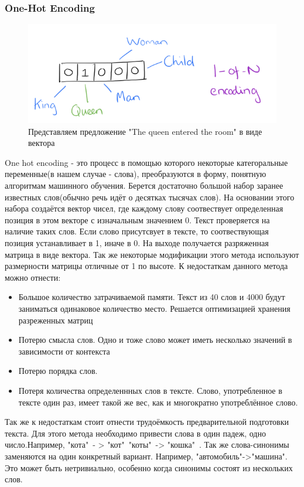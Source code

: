 \subsubsection{One-Hot Encoding}
\begin{figure}[!h]
	\centering
	\includegraphics[width=.5\textwidth]{master_img/word2vec-one-hot.png}
	\caption{Представляем предложение "The queen entered the room" в виде вектора}
	\label{fig02_master}
\end{figure}
One hot encoding - это процесс в помощью которого некоторые категоральные переменные(в нашем случае - слова), преобразуются в форму, понятную алгоритмам машинного обучения. Берется достаточно большой набор заранее известных слов(обычно речь идёт о десятках тысячах слов). На основании этого набора создаётся вектор чисел, где каждому слову соотвествует определенная позиция в этом векторе с изначальным  значением 0. Текст проверяется на наличие таких слов. Если слово присутсвует в тексте, то соотвествующая позиция устанавливает в 1, иначе в 0. На выходе получается разряженная матрица в виде вектора. Так же некоторые модификации этого метода используют размерности матрицы отличные от 1 по высоте.
К недостаткам данного метода можно отнести:
\begin{itemize}
	\item Большое количество затрачиваемой памяти. Текст из 40 слов и 4000 будут заниматься одинаковое количество место. Решается оптимизацией хранения разреженных матриц
	\item Потерю смысла слов. Одно и тоже слово может иметь несколько значений в зависимости от контекста
	\item Потерю порядка слов.
	\item Потеря количества определеннных слов в тексте. Слово, употребленное в тексте один раз, имеет такой же вес, как и многократно употреблённое слово.
\end{itemize}
Так же к недостаткам стоит отнести трудоёмкость предварительной подготовки текста.
Для этого метода необходимо привести слова в один падеж, одно число.Например, "кота"\ - > "кот"\, "коты"\ -> "кошка"\ . Так же слова-синонимы заменяются на один конкретный вариант. Например, "автомобиль"->"машина". Это может быть нетривиально, особенно когда синонимы состоят из нескольких слов.

